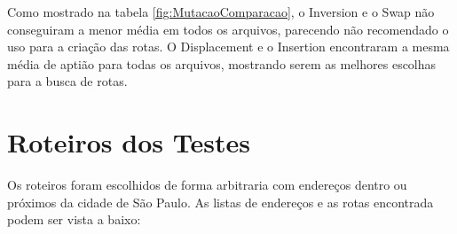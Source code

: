 \begin{center}
	\label{fig:MutacaoComparacao}
\end{center}

Como mostrado na tabela \ref{fig:MutacaoComparacao}, o Inversion e o Swap não conseguiram a menor média em todos os arquivos, parecendo não recomendado o uso para a criação das rotas. O Displacement e o Insertion encontraram a mesma média de aptião para todas os arquivos, mostrando serem as melhores escolhas para a busca de rotas.

\pagebreak
\section{Roteiros dos Testes}
Os roteiros foram escolhidos de forma arbitraria com endereços dentro ou próximos da cidade de São Paulo. As listas de endereços e as rotas encontrada podem ser vista a baixo:

\begin{center}
	\label{fig:Senac-Entregador1}
\end{center}



